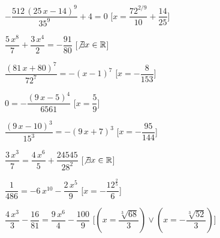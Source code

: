 \begin{esercizio}
\begin{enumeratea}
\item $-{\dfrac{512\, \left( 25\,x-14 \right) ^{9}}{35^9}}+4=0$ 
\hfill [$x={\dfrac{7 {2}^{2/9}}{10}}+{\dfrac{14}{25}}$]
\item ${\dfrac{5\,{x}^{8}}{7}}+{\dfrac{3\,{x}^{4}}{2}}=-{\dfrac
{91}{80}}$ 
\hfill [$\not\exists x \in \mathbb{R}$]
\item ${\dfrac{ \left( 81\,x+80 \right) ^{7}}{72^7}}=- \left( x-1 
\right) ^{7}$ 
\hfill [$x=-{\dfrac{8}{153}}$]
\item $0=-{\dfrac{ \left( 9\,x-5 \right) ^{4}}{6561}}$ 
\hfill [$x={\dfrac{5}{9}}$]
\item ${\dfrac{ \left( 9\,x-10 \right) ^{3}}{15^3}}=- \left( 9\,x+7 
\right) 
^{3}$ 
\hfill [$x=-{\dfrac{95}{144}}$]
\item ${\dfrac{3\,{x}^{3}}{7}}={\dfrac{4\,{x}^{6}}{5}}+{\dfrac
{24545}{28^2}}$ 
\hfill [$\not\exists x \in \mathbb{R}$]
\item ${\dfrac{1}{486}}=-6\,{x}^{10}-{\dfrac{2\,{x}^{5}}{9}}$ 
\hfill [$x=-{\dfrac{{12}^{{\frac{2}{5}}}}{6}}$]
\item ${\dfrac{4\,{x}^{3}}{3}}-{\dfrac{16}{81}}={\dfrac
{9\,{x}^{6}}{4}}-{\dfrac{100}{9}}$ 
\hfill [$(x={\dfrac{\sqrt [3]{68}}{3}})\vee (x=-{\dfrac{\sqrt 
[3]{52}}{3}})$]
\end{enumeratea}
\end{esercizio}

